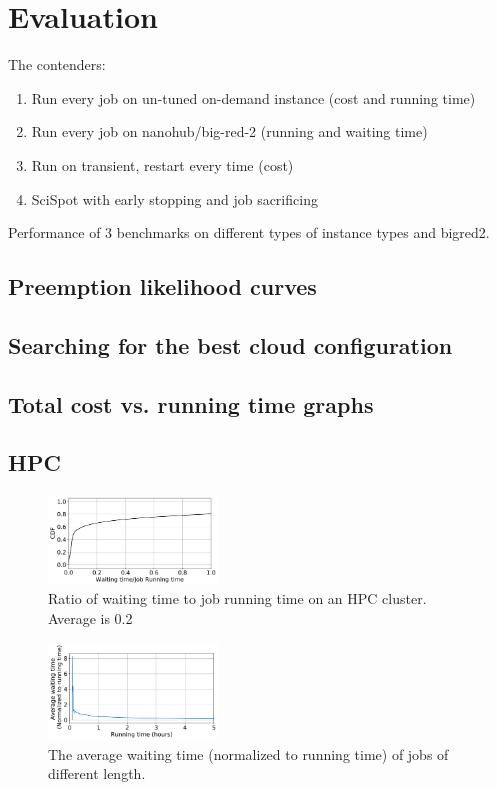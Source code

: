 \section{Evaluation}

The contenders:
\begin{enumerate}
\item Run every job on un-tuned on-demand instance (cost and running time)
\item Run every job on nanohub/big-red-2 (running and waiting time)
\item Run on transient, restart every time (cost)
\item SciSpot with early stopping and job sacrificing 
\end{enumerate}

Performance of 3 benchmarks on different types of instance types and bigred2.



\subsection{Preemption likelihood curves}


\subsection{Searching for the best cloud configuration}


\subsection{Total cost vs. running time graphs}

\subsection{HPC}

\begin{figure}
  \includegraphics[width=0.4\textwidth]{../data/waiting_all.pdf}
  \caption{Ratio of waiting time to job running time on an HPC cluster. Average is 0.2}
  \label{fig:hpc-wait-cdf}
\end{figure}

\begin{figure}
  \includegraphics[width=0.4\textwidth]{../data/waiting_cumul.pdf}
  \caption{The average waiting time (normalized to running time) of jobs of different length.}
  \label{fig:hpc-wait-cdf}
\end{figure}


